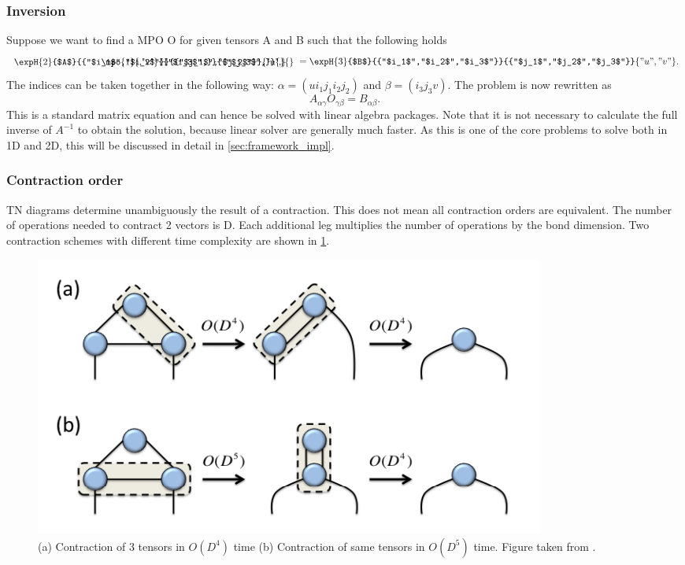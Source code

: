 \subsubsection{Inversion}

\def \figone {\expH{2}{$A$}{{"$i_1$","$i_2$"}}{{"$j_1$","$j_2$"}}{{"u",}}}
\def \figthree {\expH{3}{$B$}{{"$i_1$","$i_2$","$i_3$"}}{{"$j_1$","$j_2$","$j_3$"}}{{"u","v"}}}
\def \figtwo {\mpo{1}{{,"v"}}{{"$i_3$",}}{{"$j_3$",}}{}{}}

Suppose we want to find a \Gls{MPO} O for given tensors A and B such that the following holds
\begin{equation}
    \combineTikz{ \figone }{\figtwo}{1.8} =  \figthree .
\end{equation}
The indices can be taken together in the following way: $\alpha = (u i_1 j_1  i_2 j_2)$ and $\beta = (i_3 j_3 v)$. The problem is now rewritten as
\begin{equation}
    A_{\alpha \gamma} O_{\gamma \beta} = B_{\alpha \beta} .
\end{equation}
This is a standard matrix equation and can hence be solved with linear algebra packages. Note that it is not necessary to calculate the full inverse of $A^{-1}$ to obtain the solution, because linear solver are generally much faster. As this is one of the core problems to solve both in 1D and 2D, this will be discussed in detail in \cref{sec:framework_impl}.

\subsubsection{Contraction order}

\Gls{TN} diagrams determine unambiguously the result of a contraction. This does not mean all contraction orders are equivalent. The number of operations needed to contract 2 vectors is D. Each additional leg multiplies the number of operations by the bond dimension. Two contraction schemes with different time complexity are shown in \cref{fig:tnalgs:cont_ord}.

\begin{figure}[h!]
    \center
    \includegraphics[width=0.8 \textwidth]{Figuren/tnalgs/contraction_order.png}
    \caption{ (a) Contraction of 3 tensors in $O(D^4)$ time (b) Contraction of same tensors in $O(D^5)$ time. Figure taken from \cite{Orus2014}.  }
    \label{fig:tnalgs:cont_ord}
\end{figure}